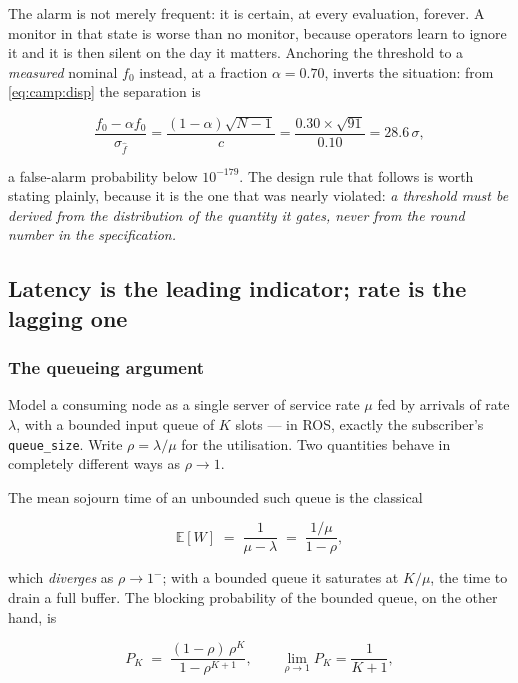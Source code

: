The alarm is not merely frequent: it is certain, at every evaluation, forever.
A monitor in that state is worse than no monitor, because operators learn to
ignore it and it is then silent on the day it matters. Anchoring the threshold
to a \emph{measured} nominal $f_0$ instead, at a fraction $\alpha = 0.70$,
inverts the situation: from \eqref{eq:camp:disp} the separation is

\begin{equation}
  \frac{f_0 - \alpha f_0}{\sigma_{\hat f}}
  = \frac{(1-\alpha)\sqrt{N-1}}{c}
  = \frac{0.30 \times \sqrt{91}}{0.10}
  = 28.6\,\sigma,
\end{equation}

a false-alarm probability below $10^{-179}$. The design rule that follows is
worth stating plainly, because it is the one that was nearly violated:
\emph{a threshold must be derived from the distribution of the quantity it
gates, never from the round number in the specification.}

\subsection{Latency is the leading indicator; rate is the lagging one}
\label{ssec:camp:latence}

\subsubsection{The queueing argument}

Model a consuming node as a single server of service rate $\mu$ fed by arrivals
of rate $\lambda$, with a bounded input queue of $K$ slots --- in ROS, exactly
the subscriber's \texttt{queue\_size}. Write $\rho = \lambda/\mu$ for the
utilisation. Two quantities behave in completely different ways as
$\rho \to 1$.

The mean sojourn time of an unbounded such queue is the classical

\begin{equation}
  \mathbb{E}[W] \;=\; \frac{1}{\mu - \lambda} \;=\; \frac{1/\mu}{1-\rho},
  \label{eq:camp:wait}
\end{equation}

which \emph{diverges} as $\rho\to1^-$; with a bounded queue it saturates at
$K/\mu$, the time to drain a full buffer. The blocking probability of the
bounded queue, on the other hand, is

\begin{equation}
  P_K \;=\; \frac{(1-\rho)\,\rho^{K}}{1-\rho^{K+1}},
  \qquad
  \lim_{\rho\to1} P_K = \frac{1}{K+1},
  \label{eq:camp:pk}
\end{equation}

